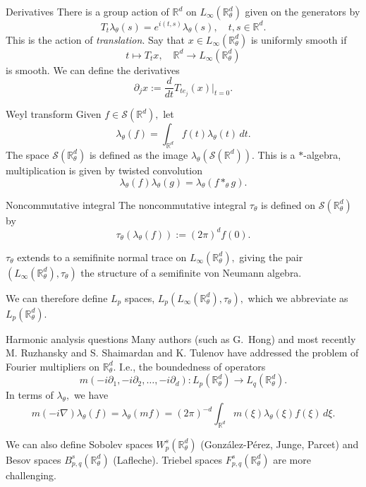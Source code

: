 \documentclass{beamer}
\numberwithin{equation}{section}
\theoremstyle{plain}
\theoremstyle{plain}
\theoremstyle{definition}
\theoremstyle{plain}
\theoremstyle{plain}
\theoremstyle{definition}
\newcommand{\Rl}{\mathbb{R}}
\newcommand{\Sc}{\mathcal{S}}
\begin{document}
\begin{frame}{Derivatives}
    There is a group action of $\Rl^d$ on $L_\infty(\Rl^d_\theta)$ given on the generators by
    \[
        T_{t}\lambda_\theta(s) = e^{i(t,s)}\lambda_\theta(s),\quad t,s\in \Rl^d.
    \]
    This is the action of \emph{translation}. Say that $x \in L_{\infty}(\Rl^d_\theta)$ is uniformly smooth if
    \[
        t\mapsto T_tx,\quad \Rl^d\to L_{\infty}(\Rl^d_\theta)
    \]
    is smooth. We can define the derivatives
    \[
        \partial_jx := \frac{d}{dt} T_{te_j}(x)|_{t=0}.
    \]
\end{frame}

\begin{frame}{Weyl transform}
    Given $f \in \Sc(\Rl^d),$ let
    \[
        \lambda_\theta(f) = \int_{\Rl^d} f(t)\lambda_\theta(t)\,dt.
    \]
    The space $\Sc(\Rl^d_\theta)$ is defined as the image $\lambda_\theta(\Sc(\Rl^d)).$ This is a $*$-algebra, multiplication is given by twisted convolution
    \[
        \lambda_\theta(f)\lambda_\theta(g) = \lambda_\theta(f\ast_\theta g).
    \]
\end{frame}

\begin{frame}{Noncommutative integral}
    The noncommutative integral $\tau_\theta$ is defined on $\Sc(\Rl^d_\theta)$ by
    \[
        \tau_\theta(\lambda_\theta(f)) := (2\pi)^d f(0).
    \]
    \begin{theorem}
        $\tau_\theta$ extends to a semifinite normal trace on $L_{\infty}(\Rl^d_\theta),$ giving the pair $(L_{\infty}(\Rl^d_\theta),\tau_\theta)$ the structure of a semifinite von Neumann algebra.
    \end{theorem}
    We can therefore define $L_p$ spaces, $L_p(L_{\infty}(\Rl^d_\theta),\tau_\theta),$ which we abbreviate as $L_p(\Rl^d_\theta).$
\end{frame}

\begin{frame}{Harmonic analysis questions}
    Many authors (such as G.~Hong) and most recently M. Ruzhansky and S. Shaimardan and K. Tulenov have addressed the problem of Fourier multipliers on $\Rl^d_\theta.$ I.e., the boundedness of operators
    \[
        m(-i\partial_1,-i\partial_2,\ldots,-i\partial_d):L_p(\Rl^d_\theta)\to L_{q}(\Rl^d_\theta).
    \]
    In terms of $\lambda_\theta,$ we have
    \[
        m(-i\nabla)\lambda_\theta(f) = \lambda_\theta(mf) = (2\pi)^{-d}\int_{\mathbb{R}^d} m(\xi)\lambda_\theta(\xi)f(\xi)\,d\xi.
    \]

    We can also define Sobolev spaces $W^s_p(\Rl^d_\theta)$ (Gonz\'alez-P\'erez, Junge, Parcet) and Besov spaces $B^s_{p,q}(\Rl^d_\theta)$ (Lafleche). Triebel spaces $F^s_{p,q}(\Rl^d_\theta)$ are more challenging.
\end{frame}
\end{document}
